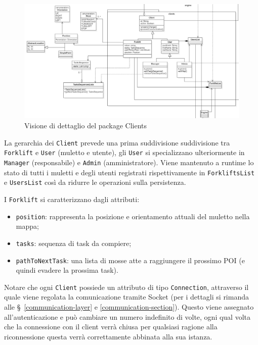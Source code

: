 \begin{figure}[H]
	\centering
	\includegraphics[scale=0.40]{res/diagrams/server/server_pack_clients.jpg}
	\caption{Visione di dettaglio del package Clients}
\end{figure}

La gerarchia dei \texttt{Client} prevede una prima suddivisione suddivisione tra \texttt{Forklift} e \texttt{User} (muletto e utente), gli \texttt{User} si specializzano ulteriormente in \texttt{Manager} (responsabile) e \texttt{Admin} (amministratore). Viene mantenuto a runtime lo stato di tutti i muletti e degli utenti registrati rispettivamente in \texttt{ForkliftsList} e \texttt{UsersList} così da ridurre le operazioni sulla persistenza.

I \texttt{Forklift} si caratterizzano dagli attributi:
\begin{itemize}
	\item \texttt{position}: rappresenta la posizione e orientamento attuali del muletto nella mappa;
	\item \texttt{tasks}: sequenza di task da compiere;
	\item \texttt{pathToNextTask}: una lista di mosse atte a raggiungere il prossimo POI (e quindi evadere la prossima task).
\end{itemize}

Notare che ogni \texttt{Client} possiede un attributo di tipo \texttt{Connection}, attraverso il quale viene regolata la comunicazione tramite Socket (per i dettagli si rimanda alle \S\ \ref{communication-layer} e \ref{communication-section}). Questo viene assegnato all'autenticazione e può cambiare un numero indefinito di volte, ogni qual volta che la connessione con il client verrà chiusa per qualsiasi ragione alla riconnessione questa verrà correttamente abbinata alla sua istanza.\\

